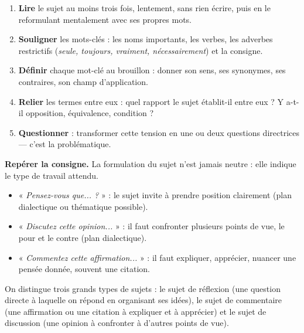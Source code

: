 \documentclass[11pt]{article}
\newcommand{\cle}[1]{{\popxbold\color{popdark}#1}}
\newcounter{popsec}
\newcounter{popsub}
\newcommand{\courssub}[1]{%
  \stepcounter{popsub}%
  \par\vspace{9pt}\noindent{\popxbold\fontsize{11.5}{13}\selectfont\color{popink}{\color{poporange}\thepopsec.\thepopsub}\hspace{6pt}#1}\par\nopagebreak\vspace{4pt}
}
\begin{document}
\begin{methode}
\begin{enumerate}
\item \textbf{Lire} le sujet au moins trois fois, lentement, sans rien écrire, puis en le reformulant mentalement avec ses propres mots.
\item \textbf{Souligner} les mots-clés : les noms importants, les verbes, les adverbes restrictifs (\emph{seule, toujours, vraiment, nécessairement}) et la consigne.
\item \textbf{Définir} chaque mot-clé au brouillon : donner son sens, ses synonymes, ses contraires, son champ d'application.
\item \textbf{Relier} les termes entre eux : quel rapport le sujet établit-il entre eux ? Y a-t-il opposition, équivalence, condition ?
\item \textbf{Questionner} : transformer cette tension en une ou deux questions directrices — c'est la problématique.
\end{enumerate}
\end{methode}

\textbf{Repérer la consigne.} La formulation du sujet n'est jamais neutre : elle indique le type de travail attendu.
\begin{itemize}
\item « \emph{Pensez-vous que... ?} » : le sujet invite à prendre position clairement (plan dialectique ou thématique possible).
\item « \emph{Discutez cette opinion...} » : il faut confronter plusieurs points de vue, le pour et le contre (plan dialectique).
\item « \emph{Commentez cette affirmation...} » : il faut expliquer, apprécier, nuancer une pensée donnée, souvent une citation.
\end{itemize}

\courssub{Les trois types de sujets}

\begin{definition}
On distingue trois grands types de sujets : le \cle{sujet de réflexion} (une question directe à laquelle on répond en organisant ses idées), le \cle{sujet de commentaire} (une affirmation ou une citation à expliquer et à apprécier) et le \cle{sujet de discussion} (une opinion à confronter à d'autres points de vue).
\end{definition}
\end{document}
